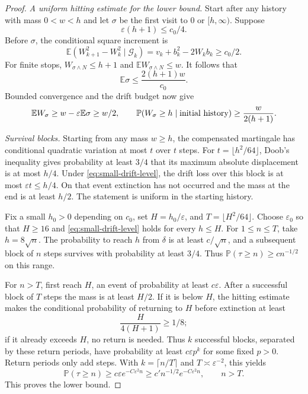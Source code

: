 \documentclass[11pt]{article}
\numberwithin{equation}{section}
\theoremstyle{definition}
\newcommand{\E}{\mathbb E}
\newcommand{\Prob}{\mathbb P}
\begin{document}
\begin{proof}
\emph{A uniform hitting estimate for the lower bound.} Start after any history with mass $0<w<h$ and let $\sigma$ be the first visit to $0$ or $[h,\infty)$. Suppose
\begin{equation}\label{eq:small-drift-level}
 \varepsilon(h+1)\le c_0/4.
\end{equation}
Before $\sigma$, the conditional square increment is
\[
 \E(W_{k+1}^2-W_k^2\mid\mathcal G_k)
 =v_k+b_k^2-2W_kb_k\ge c_0/2.
\]
For finite stops, $W_{\sigma\wedge N}\le h+1$ and $\E W_{\sigma\wedge N}\le w$. It follows that
\[
 \E\sigma\le\frac{2(h+1)w}{c_0}.
\]
Bounded convergence and the drift budget now give
\[
 \E W_\sigma\ge w-\varepsilon\E\sigma\ge w/2,
 \qquad
 \Prob(W_\sigma\ge h\mid\hbox{initial history})
 \ge\frac{w}{2(h+1)}.
\]

\emph{Survival blocks.} Starting from any mass $w\ge h$, the compensated martingale has conditional quadratic variation at most $t$ over $t$ steps. For $t=\lfloor h^2/64\rfloor$, Doob's inequality gives probability at least $3/4$ that its maximum absolute displacement is at most $h/4$. Under \eqref{eq:small-drift-level}, the drift loss over this block is at most $\varepsilon t\le h/4$. On that event extinction has not occurred and the mass at the end is at least $h/2$. The statement is uniform in the starting history.

Fix a small $h_0>0$ depending on $c_0$, set $H=h_0/\varepsilon$, and $T=\lfloor H^2/64\rfloor$. Choose $\varepsilon_0$ so that $H\ge16$ and \eqref{eq:small-drift-level} holds for every $h\le H$. For $1\le n\le T$, take $h=8\sqrt n$. The probability to reach $h$ from $\delta$ is at least $c/\sqrt n$, and a subsequent block of $n$ steps survives with probability at least $3/4$. Thus $\Prob(\tau\ge n)\ge c n^{-1/2}$ on this range.

For $n>T$, first reach $H$, an event of probability at least $c\varepsilon$. After a successful block of $T$ steps the mass is at least $H/2$. If it is below $H$, the hitting estimate makes the conditional probability of returning to $H$ before extinction at least
\[
 \frac{H}{4(H+1)}\ge1/8;
\]
if it already exceeds $H$, no return is needed. Thus $k$ successful blocks, separated by these return periods, have probability at least $c\varepsilon p^k$ for some fixed $p>0$. Return periods only add steps. With $k=\lceil n/T\rceil$ and $T\asymp\varepsilon^{-2}$, this yields
\[
 \Prob(\tau\ge n)\ge c\varepsilon e^{-C\varepsilon^2n}
 \ge c' n^{-1/2}e^{-C\varepsilon^2n},\qquad n>T.
\]
This proves the lower bound.


\end{proof}
\end{document}
